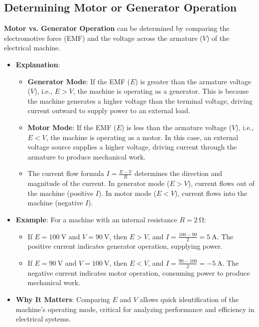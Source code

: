 \documentclass[12pt]{article}
\newcommand{\concept}[1]{\textbf{#1}}
\begin{document}
\subsection{Determining Motor or Generator Operation}
\concept{Motor vs. Generator Operation} can be determined by comparing the electromotive force (EMF) and the voltage across the armature (\(V\)) of the electrical machine.
\begin{itemize}
    \item \textbf{Explanation}:
        \begin{itemize}
            \item \textbf{Generator Mode}: If the EMF (\(E\)) is greater than the armature voltage (\(V\)), i.e., \(E > V\), the machine is operating as a generator. This is because the machine generates a higher voltage than the terminal voltage, driving current outward to supply power to an external load.
            \item \textbf{Motor Mode}: If the EMF (\(E\)) is less than the armature voltage (\(V\)), i.e., \(E < V\), the machine is operating as a motor. In this case, an external voltage source supplies a higher voltage, driving current through the armature to produce mechanical work.
            \item The current flow formula \(I = \frac{E - V}{R}\) determines the direction and magnitude of the current. In generator mode (\(E > V\)), current flows out of the machine (positive \(I\)). In motor mode (\(E < V\)), current flows into the machine (negative \(I\)).
        \end{itemize}
    \item \textbf{Example}: For a machine with an internal resistance \(R = \SI{2}{\ohm}\):
        \begin{itemize}
            \item If \(E = \SI{100}{\volt}\) and \(V = \SI{90}{\volt}\), then \(E > V\), and \(I = \frac{100 - 90}{2} = \SI{5}{\ampere}\). The positive current indicates generator operation, supplying power.
            \item If \(E = \SI{90}{\volt}\) and \(V = \SI{100}{\volt}\), then \(E < V\), and \(I = \frac{90 - 100}{2} = \SI{-5}{\ampere}\). The negative current indicates motor operation, consuming power to produce mechanical work.
        \end{itemize}
    \item \textbf{Why It Matters}: Comparing \(E\) and \(V\) allows quick identification of the machine’s operating mode, critical for analyzing performance and efficiency in electrical systems.
\end{itemize}
\end{document}
